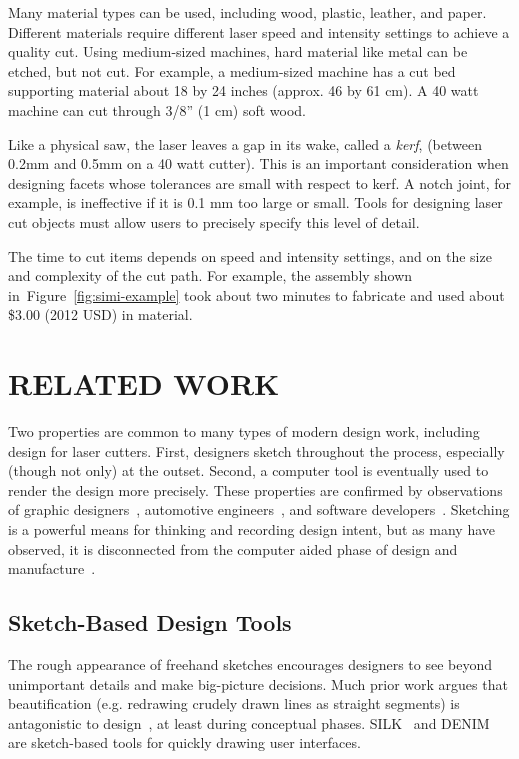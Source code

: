 \documentclass{article}
\begin{document}
Many material types can be used, including wood, plastic, leather, and
paper. Different materials require different laser speed and intensity
settings to achieve a quality cut. Using medium-sized machines, hard
material like metal can be etched, but not cut. For example, a
medium-sized machine has a cut bed supporting material about 18 by 24
inches (approx. 46 by 61 cm). A 40 watt machine can cut through 3/8''
(1 cm) soft wood.

Like a physical saw, the laser leaves a gap in its wake, called a
\textit{kerf}, (between 0.2mm and 0.5mm on a 40 watt cutter). This is
an important consideration when designing facets whose tolerances are
small with respect to kerf. A notch joint, for example, is ineffective
if it is 0.1 mm too large or small. Tools for designing laser cut
objects must allow users to precisely specify this level of detail.

The time to cut items depends on speed and intensity settings, and on
the size and complexity of the cut path. For example, the assembly
shown in~Figure~\ref{fig:simi-example} took about two minutes to
fabricate and used about \$3.00 (2012 USD) in material.

\section{RELATED WORK}

Two properties are common to many types of modern design work,
including design for laser cutters. First, designers sketch throughout
the process, especially (though not only) at the outset. Second, a
computer tool is eventually used to render the design more
precisely. These properties are confirmed by observations of graphic
designers~\cite{wong-rr-prototypes}, automotive
engineers~\cite{kara-styling}, and software
developers~\cite{dekel-improvised-notation}. Sketching is a powerful
means for thinking and recording design intent, but as many have
observed, it is disconnected from the computer aided phase of design
and manufacture~\cite{company-sketching-in-engineering}.

\subsection{Sketch-Based Design Tools}

The rough appearance of freehand sketches encourages designers to see
beyond unimportant details and make big-picture decisions. Much prior
work argues that beautification (e.g. redrawing crudely drawn lines as
straight segments) is antagonistic to design~\cite{gross-cocktail}, at
least during conceptual phases. SILK~\cite{landay-silk-chi} and
DENIM~\cite{lin-denim} are sketch-based tools for quickly drawing user
interfaces.
\end{document}
